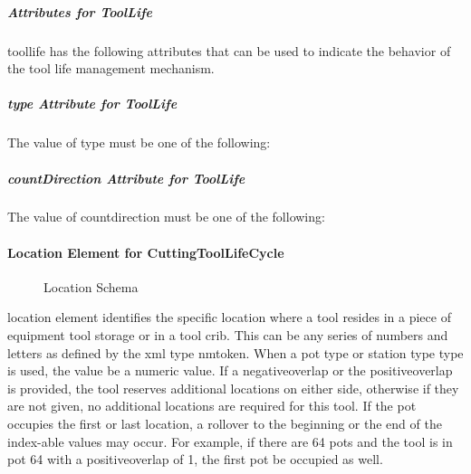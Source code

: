 \pagebreak

\subparagraph{Attributes for ToolLife}\mbox{}

\gls{toollife} has the following attributes that can be used to indicate the behavior of the tool life management mechanism.



\subparagraph{type Attribute for ToolLife}\mbox{}

The value of \gls{type} must be one of the following:



\subparagraph{countDirection Attribute for ToolLife}\mbox{}

The value of \gls{countdirection} must be one of the following:



\paragraph{Location Element for CuttingToolLifeCycle}\mbox{}

\begin{figure}[ht]
  \centering
  \caption{Location Schema}
  \label{fig:location-schema}
\end{figure}

\FloatBarrier

\gls{location} element identifies the specific location where a tool resides in a piece of equipment tool storage or in a tool crib.  This can be any series of numbers and letters as defined by the \gls{xml} type \gls{nmtoken}.  When a \gls{pot type} or \gls{station type} type is used, the value \MUST be a numeric value.  If a \gls{negativeoverlap} or the \gls{positiveoverlap} is provided, the tool reserves additional locations on either side, otherwise if they are not given, no additional locations are required for this tool.  If the pot occupies the first or last location, a rollover to the beginning or the end of the index-able values may occur.  For example, if there are 64 pots and the tool is in pot 64 with a \gls{positiveoverlap} of 1, the first pot \MAY be occupied as well.

